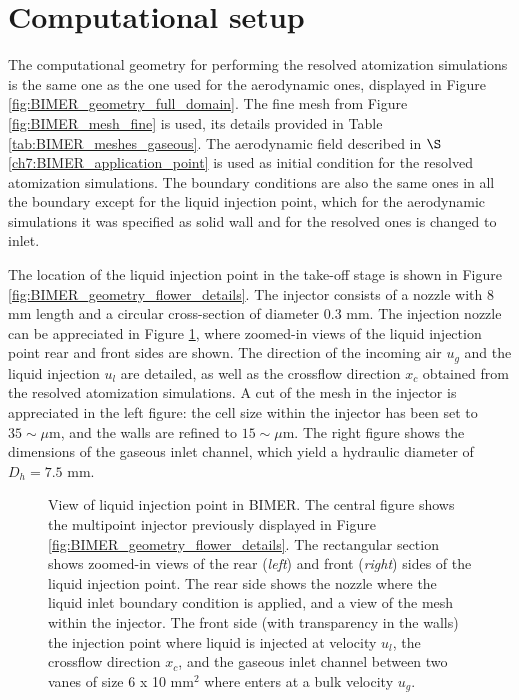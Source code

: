 \section{Computational setup}
\label{sec:ch8_BIMER_computational_setup}

The computational geometry for performing the resolved atomization simulations is the same one as the one used for the aerodynamic ones, displayed in Figure \ref{fig:BIMER_geometry_full_domain}. The fine mesh from Figure \ref{fig:BIMER_mesh_fine} is used, its details provided in Table \ref{tab:BIMER_meshes_gaseous}. The aerodynamic field described in $\S$\ref{ch7:BIMER_application_point} is used as initial condition for the resolved atomization simulations. The boundary conditions are also the same ones in all the boundary except for the liquid injection point, which for the aerodynamic simulations it was specified as solid wall and for the resolved ones is changed to inlet. 

The location of the liquid injection point in the take-off stage is shown in Figure \ref{fig:BIMER_geometry_flower_details}. The injector consists of a nozzle with 8 mm length and a circular cross-section of diameter 0.3 mm. The injection nozzle can be appreciated in Figure \ref{fig:BIMER_liquid_injector_views}, where zoomed-in views of the liquid injection point rear and front sides are shown. The direction of the incoming air $u_g$ and the liquid injection $u_l$ are detailed, as well as the crossflow direction $x_c$ obtained from the resolved atomization simulations. A cut of the mesh in the injector is appreciated in the left figure: the cell size within the injector has been set to $35 \sim \mu$m, and the walls are refined to $15 \sim \mu$m. The right figure shows the dimensions of the gaseous inlet channel, which yield a hydraulic diameter of $D_h = 7.5$ mm. 


\begin{figure}[h!]
	\centering
	\caption[View of liquid injection point in BIMER]{View of liquid injection point in BIMER. The central figure shows the multipoint injector previously displayed in Figure \ref{fig:BIMER_geometry_flower_details}. The rectangular section shows zoomed-in views of the rear (\textsl{left}) and front (\textsl{right}) sides of the liquid injection point. The rear side shows the nozzle where the liquid inlet boundary condition is applied, and a view of the mesh within the injector. The front side (with transparency in the walls) the injection point where liquid is injected at velocity $u_l$, the crossflow direction $x_c$, and the gaseous inlet channel between two vanes of size 6 x 10 mm$^2$ where enters at a bulk velocity $u_g$.}%
	\label{fig:BIMER_liquid_injector_views}
\end{figure}

